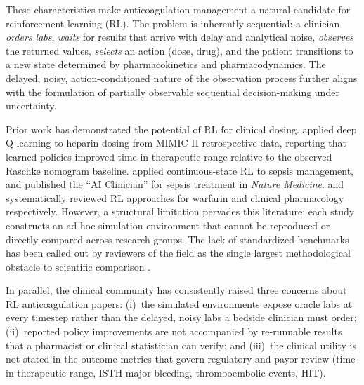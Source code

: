 \documentclass[11pt]{article}
\begin{document}
These characteristics make anticoagulation management a natural candidate for reinforcement learning (RL). The problem is inherently sequential: a clinician \emph{orders labs}, \emph{waits} for results that arrive with delay and analytical noise, \emph{observes} the returned values, \emph{selects} an action (dose, drug), and the patient transitions to a new state determined by pharmacokinetics and pharmacodynamics. The delayed, noisy, action-conditioned nature of the observation process further aligns with the formulation of partially observable sequential decision-making under uncertainty.

Prior work has demonstrated the potential of RL for clinical dosing. \citet{nemati2016} applied deep Q-learning to heparin dosing from MIMIC-II retrospective data, reporting that learned policies improved time-in-therapeutic-range relative to the observed Raschke nomogram baseline. \citet{raghu2017} applied continuous-state RL to sepsis management, and \citet{komorowski2018} published the ``AI Clinician'' for sepsis treatment in \emph{Nature Medicine}. \citet{anzabizadeh2023} and \citet{tosca2024} systematically reviewed RL approaches for warfarin and clinical pharmacology respectively. However, a structural limitation pervades this literature: each study constructs an ad-hoc simulation environment that cannot be reproduced or directly compared across research groups. The lack of standardized benchmarks has been called out by reviewers of the field as the single largest methodological obstacle to scientific comparison \citep{ghassemi2018}.

In parallel, the clinical community has consistently raised three concerns about RL anticoagulation papers: (i)~the simulated environments expose oracle labs at every timestep rather than the delayed, noisy labs a bedside clinician must order; (ii)~reported policy improvements are not accompanied by re-runnable results that a pharmacist or clinical statistician can verify; and (iii)~the clinical utility is not stated in the outcome metrics that govern regulatory and payor review (time-in-therapeutic-range, ISTH major bleeding, thromboembolic events, HIT).
\end{document}
